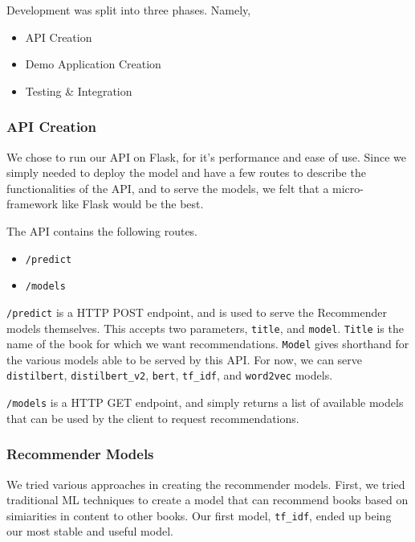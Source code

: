 Development was split into three phases. Namely,
\begin{itemize}
    \item API Creation
    \item Demo Application Creation
    \item Testing \& Integration
\end{itemize}

\subsubsection{API Creation}
We chose to run our API on Flask, for it's performance and ease of use. Since
we simply needed to deploy the model and have a few routes to describe the
functionalities of the API, and to serve the models, we felt that a
micro-framework like Flask would be the best.

The API contains the following routes.
\begin{itemize}[label={}]
    \item \texttt{/predict}
    \item \texttt{/models}
\end{itemize}

\texttt{/predict} is a HTTP POST endpoint, and is used to serve the Recommender models themselves. This accepts two parameters, \texttt{title}, and \texttt{model}. \texttt{Title} is the name of the book for which we want recommendations. \texttt{Model} gives shorthand for the various models able to be served by this API. For now, we can serve \texttt{distilbert}, \texttt{distilbert\_v2}, \texttt{bert}, \texttt{tf\_idf}, and \texttt{word2vec} models.

\texttt{/models} is a HTTP GET endpoint, and simply returns a list of available models that can be used by the client to request recommendations.

\subsubsection*{Recommender Models}
We tried various approaches in creating the recommender models. First, we tried traditional ML techniques to create a model that can recommend books based on simiarities in content to other books. Our first model, \texttt{tf\_idf}, ended up being our most stable and useful model.

